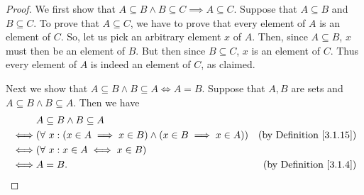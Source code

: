 \begin{proof}
We first show that \(A \subseteq B \land B \subseteq C \implies A \subseteq C\).
Suppose that \(A \subseteq B\) and \(B \subseteq C\).
To prove that \(A \subseteq C\), we have to prove that every element of \(A\) is an element of \(C\).
So, let us pick an arbitrary element \(x\) of \(A\).
Then, since \(A \subseteq B\), \(x\) must then be an element of \(B\).
But then since \(B \subseteq C\), \(x\) is an element of \(C\).
Thus every element of \(A\) is indeed an element of \(C\), as claimed.

Next we show that \(A \subseteq B \land B \subseteq A \iff A = B\).
Suppose that \(A, B\) are sets and \(A \subseteq B \land B \subseteq A\).
Then we have
\begin{align*}
& A \subseteq B \land B \subseteq A \\
\iff & (\forall\ x : (x \in A \implies x \in B) \land (x \in B \implies x \in A)) & \text{(by Definition \ref{3.1.15})} \\
\iff & (\forall\ x : x \in A \iff x \in B) \\
\iff & A = B. & \text{(by Definition \ref{3.1.4})}
\end{align*}


\end{proof}
